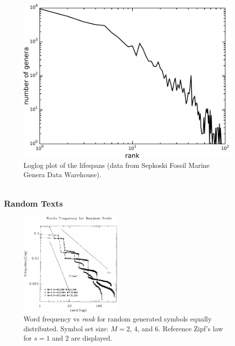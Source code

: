 \documentclass{beamer}
\begin{document}
{\begin{columns}[c]
    \begin{figure}[h!]
    \centering
    \includegraphics[width=\textwidth]{imagespresentation/num_genera_loglog.pdf}
    \caption{Loglog plot of the lifespans (data from Sepkoski Fossil Marine Genera Data Warehouse).}
    \label{fig:num_genera_loglog}
    \end{figure}
 
  \end{columns}
}






\frame
{
  \frametitle{Random Texts}
    \begin{figure}[h!]
    \centering
    \includegraphics[width=0.45\textwidth]{imagespresentation/wentianli.png}
    \caption{Word frequency vs \emph{rank} for random generated symbols equally distributed. 
    Symbol set size: $M=2$, $4$, and $6$. Reference Zipf's law for $s=1$ and $2$ are displayed. \citep{li1992,miller1957}}
    \label{fig:wentianli}
    \end{figure}
}
\end{document}
